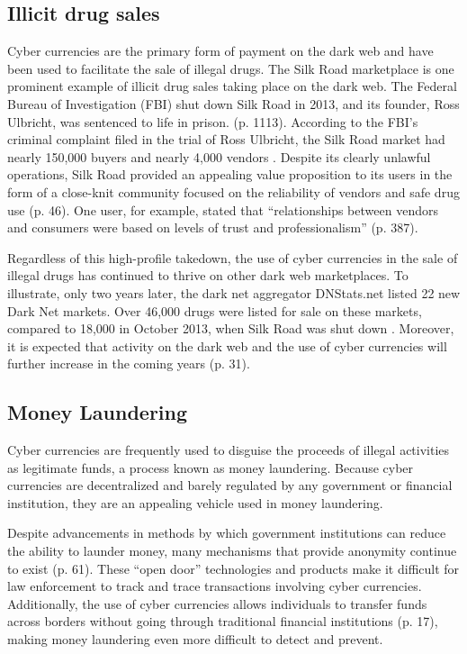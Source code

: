 \subsection*{Illicit drug sales}

Cyber currencies are the primary form of payment on the dark web and have been used to facilitate the sale of illegal drugs. The Silk Road marketplace is one prominent example of illicit drug sales taking place on the dark web. The Federal Bureau of Investigation (FBI) shut down Silk Road in 2013, and its founder, Ross Ulbricht, was sentenced to life in prison. \cite{dolliver_evaluating_2015} (p. 1113).  According to the FBI's criminal complaint filed in the trial of Ross Ulbricht, the Silk Road market had nearly 150,000 buyers and nearly 4,000 vendors \cite{noauthor_united_nodate}. Despite its clearly unlawful operations, Silk Road provided an appealing value proposition to its users in the form of a close-knit community focused on the reliability of vendors and safe drug use \cite{lacson_21st_2016} (p. 46). One user, for example, stated that “relationships between vendors and consumers were based on levels of trust and professionalism” \cite{van_hout_silk_2013} (p. 387).

Regardless of this high-profile takedown, the use of cyber currencies in the sale of illegal drugs has continued to thrive on other dark web marketplaces. To illustrate, only two years later, the dark net aggregator DNStats.net listed 22 new Dark Net markets. Over 46,000 drugs were listed for sale on these markets, compared to 18,000 in October 2013, when Silk Road was shut down \cite{digital_citizens_alliance_silk_2015}. Moreover, it is expected that activity on the dark web and the use of cyber currencies will further increase in the coming years \cite{ablon_markets_2014} (p. 31).

\subsection*{Money Laundering}

Cyber currencies are frequently used to disguise the proceeds of illegal activities as legitimate funds, a process known as money laundering. Because cyber currencies are decentralized and barely regulated by any government or financial institution, they are an appealing vehicle used in money laundering.

Despite advancements in methods by which government institutions can reduce the ability to launder money, many mechanisms that provide anonymity continue to exist \cite{dupuis_money_2020} (p. 61). These “open door” technologies and products make it difficult for law enforcement to track and trace transactions involving cyber currencies. Additionally, the use of cyber currencies allows individuals to transfer funds across borders without going through traditional financial institutions \cite{filipkowski_cyber_2008} (p. 17), making money laundering even more difficult to detect and prevent.

